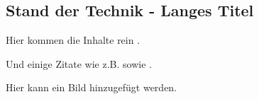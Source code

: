\begin{showRelatedWork}%
%
\chapter[Stand der Technik - Kurztitel für Inhaltsverzeichnis und Kolumnentitel]{Stand der Technik - Langes Titel}%
\label{chap:StandDerTechnik}
%
Hier kommen die Inhalte rein .

%
%
Und einige Zitate wie z.B. 
\cite{BarShalom-Tse-TICEWPDA-Automatica-75,BarShalom_TrackingMethodsin_1978,Bar-Shalom-AC1984-JPDA,BarShalom-MTMST-1990,BarShalom-MTT-Buch-Band2,BarShalom-MMTAA-Buch-2000}
sowie
\cite{Zomotor-Fahrverhalten-1991}.

Hier kann ein Bild hinzugefügt werden.

\myTodoImg
%
\end{showRelatedWork}%